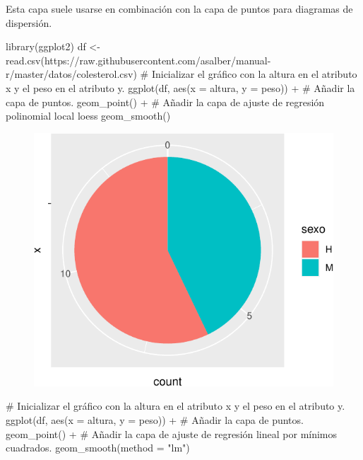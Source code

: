 \documentclass[
  a4paper,
]{scrreport}
\newenvironment{Shaded}{\begin{snugshade}}{\end{snugshade}}
\newcommand{\AttributeTok}[1]{\textcolor[rgb]{0.40,0.45,0.13}{#1}}
\newcommand{\CommentTok}[1]{\textcolor[rgb]{0.37,0.37,0.37}{#1}}
\newcommand{\FunctionTok}[1]{\textcolor[rgb]{0.28,0.35,0.67}{#1}}
\newcommand{\NormalTok}[1]{\textcolor[rgb]{0.00,0.23,0.31}{#1}}
\newcommand{\OtherTok}[1]{\textcolor[rgb]{0.00,0.23,0.31}{#1}}
\newcommand{\SpecialCharTok}[1]{\textcolor[rgb]{0.37,0.37,0.37}{#1}}
\newcommand{\StringTok}[1]{\textcolor[rgb]{0.13,0.47,0.30}{#1}}
\theoremstyle{definition}
\theoremstyle{definition}
\theoremstyle{remark}
\begin{document}
Esta capa suele usarse en combinación con la capa de puntos para
diagramas de dispersión.

\begin{Shaded}
\begin{Highlighting}[]
\FunctionTok{library}\NormalTok{(ggplot2)}
\NormalTok{df }\OtherTok{\textless{}{-}} \FunctionTok{read.csv}\NormalTok{(}\StringTok{\textquotesingle{}https://raw.githubusercontent.com/asalber/manual{-}r/master/datos/colesterol.csv\textquotesingle{}}\NormalTok{)}
\CommentTok{\# Inicializar el gráfico con la altura en el atributo x y el peso en el atributo y.}
\FunctionTok{ggplot}\NormalTok{(df, }\FunctionTok{aes}\NormalTok{(}\AttributeTok{x =}\NormalTok{ altura, }\AttributeTok{y =}\NormalTok{ peso)) }\SpecialCharTok{+}
\CommentTok{\# Añadir la capa de puntos.}
    \FunctionTok{geom\_point}\NormalTok{() }\SpecialCharTok{+}
\CommentTok{\# Añadir la capa de ajuste de regresión polinomial local loess}
    \FunctionTok{geom\_smooth}\NormalTok{()}
\end{Highlighting}
\end{Shaded}

\begin{figure}[H]

{\centering \includegraphics{./07-graficos_files/figure-pdf/unnamed-chunk-23-1.pdf}

}

\end{figure}

\begin{Shaded}
\begin{Highlighting}[]
\CommentTok{\# Inicializar el gráfico con la altura en el atributo x y el peso en el atributo y.}
\FunctionTok{ggplot}\NormalTok{(df, }\FunctionTok{aes}\NormalTok{(}\AttributeTok{x =}\NormalTok{ altura, }\AttributeTok{y =}\NormalTok{ peso)) }\SpecialCharTok{+}
\CommentTok{\# Añadir la capa de puntos.}
    \FunctionTok{geom\_point}\NormalTok{() }\SpecialCharTok{+}
\CommentTok{\# Añadir la capa de ajuste de regresión lineal por mínimos cuadrados.}
    \FunctionTok{geom\_smooth}\NormalTok{(}\AttributeTok{method =} \StringTok{"lm"}\NormalTok{)}
\end{Highlighting}
\end{Shaded}
\end{document}
